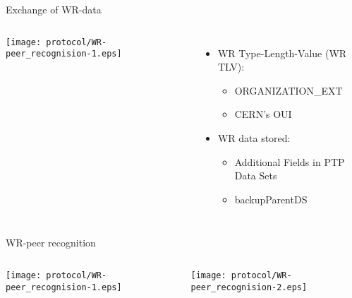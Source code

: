 \documentclass[compress,red]{beamer}
\begin{document}
\begin{frame}{Exchange of WR-data}

  \begin{columns}[c]

    \begin{center}
    \texttt{[image: protocol/WR-peer\_recognision-1.eps]}
    \end{center}


      \begin{itemize}
	\item WR Type-Length-Value (WR TLV):
	  \begin{itemize}
	    \item ORGANIZATION\_EXT
	    \item CERN's OUI
	  \end{itemize}
 	\vspace{0.5cm}
	\item WR data stored:
	  \begin{itemize}
	    \item Additional Fields in PTP Data Sets
	    \item backupParentDS
	  \end{itemize}
      \end{itemize}

  \end{columns}


\end{frame}
\begin{frame}{WR-peer recognition}

  \begin{columns}[c]

    \begin{center}
    \texttt{[image: protocol/WR-peer\_recognision-1.eps]}
    \end{center}


    \begin{center}
    \texttt{[image: protocol/WR-peer\_recognision-2.eps]}
    \end{center}

  \end{columns}

\end{frame}
\end{document}
